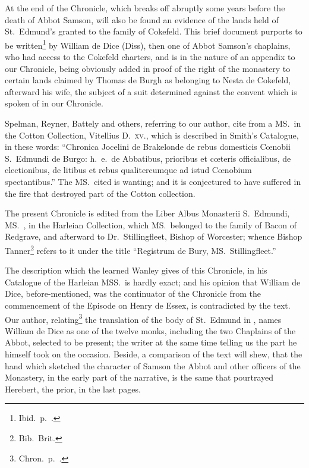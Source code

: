 \documentclass[10pt]{book}
\begin{document}
{At the end of the Chronicle, which breaks off abruptly some years before the death of Abbot Samson, will also be found an evidence of the lands held of St.\ Edmund's granted to the family of Cokefeld. This brief document purports to be written\footnote{Ibid.\ p.\ .} by William de Dice (Diss), then one of Abbot Samson's chaplains, who had access to the Cokefeld charters, and is in the nature of an appendix to our Chronicle, being obviously added in proof of the right of the monastery to certain lands claimed by Thomas de Burgh as belonging to Nesta de Cokefeld, afterward his wife, the subject of a suit determined against the convent which is spoken of in our Chronicle.

Spelman, Reyner, Battely and others, referring to our author, cite from a MS.\ in the Cotton Collection, Vitellius D.\ \textsc{xv}., which is described in Smith's Catalogue, in these words: ``Chronica Jocelini de Brakelonde de rebus domesticis C\oe{}nobii S.\ Edmundi de Burgo: h.\ e.\ de Abbatibus, prioribus et c\oe{}teris officialibus, de electionibus, de litibus et rebus qualitercumque ad istud C\oe{}nobium spectantibus.'' The MS.\ cited is wanting; and it is conjectured to have suffered in the fire that destroyed part of the Cotton collection.

The present Chronicle is edited from the Liber Albus Monasterii S.\ Edmundi, MS.\ , in the Harleian Collection, which MS.\ belonged to the family of Bacon of Redgrave, and afterward to Dr.\ Stillingfleet, Bishop of Worcester; whence Bishop Tanner\footnote{Bib.\ Brit.} refers to it under the title ``Registrum de Bury, MS.\ Stillingfleet.''

The description which the learned Wanley gives of this Chronicle, in his Catalogue of the Harleian MSS.\ is hardly exact; and his opinion that William de Dice, before-mentioned, was the continuator of the Chronicle from the commencement of the Episode on Henry de Essex, is contradicted by the text. Our author, relating\footnote{Chron.\ p.\ .} the translation of the body of St.\ Edmund in , names William de Dice as one of the twelve monks, including the two Chaplains of the Abbot, selected to be present; the writer at the same time telling us the part he himself took on the occasion. Beside, a comparison of the text will shew, that the hand which sketched the character of Samson the Abbot and other officers of the Monastery, in the early part of the narrative, is the same that pourtrayed Herebert, the prior, in the last pages.

}
\end{document}
